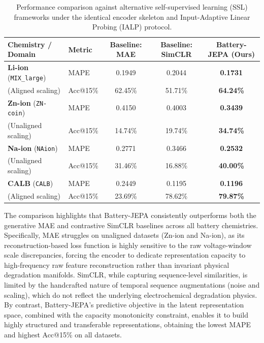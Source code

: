 \documentclass[a4paper,fleqn]{cas-dc}
\begin{document}
\begin{table}[t]
\caption{Performance comparison against alternative self-supervised learning (SSL) frameworks under the identical encoder skeleton and Input-Adaptive Linear Probing (IALP) protocol.}
\label{tbl:ssl_comparison}
\centering
\small
\begin{tabular*}{\textwidth}{@{\extracolsep{\fill}}llccc@{}}
\toprule
Chemistry / Domain & Metric & Baseline: MAE & Baseline: SimCLR & Battery-JEPA (Ours) \\
\midrule
\textbf{Li-ion} (\texttt{MIX\_large}) & MAPE & 0.1949 & 0.2044 & \textbf{0.1731} \\
(Aligned scaling) & Acc@15\% & 62.45\% & 51.71\% & \textbf{64.24\%} \\
\midrule
\textbf{Zn-ion} (\texttt{ZN-coin}) & MAPE & 0.4150 & 0.4003 & \textbf{0.3439} \\
(Unaligned scaling) & Acc@15\% & 14.74\% & 19.74\% & \textbf{34.74\%} \\
\midrule
\textbf{Na-ion} (\texttt{NAion}) & MAPE & 0.2771 & 0.3466 & \textbf{0.2532} \\
(Unaligned scaling) & Acc@15\% & 31.46\% & 16.88\% & \textbf{40.00\%} \\
\midrule
\textbf{CALB} (\texttt{CALB}) & MAPE & 0.2449 & 0.1195 & \textbf{0.1196} \\
(Aligned scaling) & Acc@15\% & 23.69\% & 78.62\% & \textbf{79.87\%} \\
\bottomrule
\end{tabular*}
\end{table}

The comparison highlights that Battery-JEPA consistently outperforms both the generative MAE and contrastive SimCLR baselines across all battery chemistries. Specifically, MAE struggles on unaligned datasets (Zn-ion and Na-ion), as its reconstruction-based loss function is highly sensitive to the raw voltage-window scale discrepancies, forcing the encoder to dedicate representation capacity to high-frequency raw feature reconstruction rather than invariant physical degradation manifolds. SimCLR, while capturing sequence-level similarities, is limited by the handcrafted nature of temporal sequence augmentations (noise and scaling), which do not reflect the underlying electrochemical degradation physics. By contrast, Battery-JEPA's predictive objective in the latent representation space, combined with the capacity monotonicity constraint, enables it to build highly structured and transferable representations, obtaining the lowest MAPE and highest Acc@15\% on all datasets.
\end{document}
